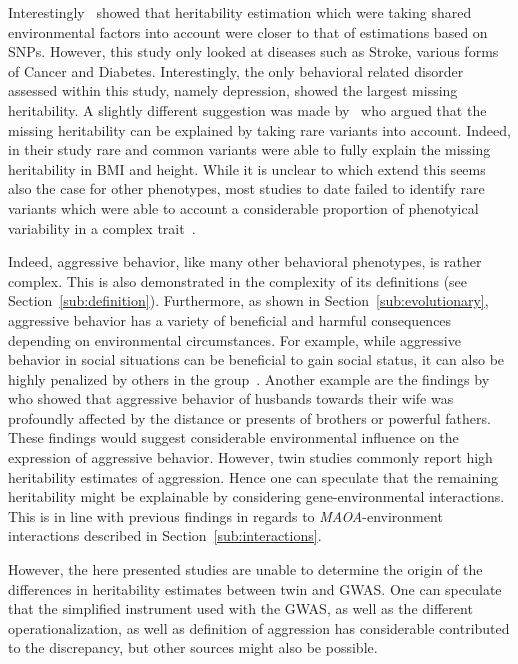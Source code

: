 Interestingly~\citet{Munoz2016a} showed that heritability estimation which were taking shared environmental factors into account were closer to that of estimations based on SNPs.
However, this study only looked at diseases such as Stroke, various forms of Cancer and Diabetes.
Interestingly, the only behavioral related disorder assessed within this study, namely depression, showed the largest missing heritability.
A slightly different suggestion was made by~\citet{Yang2015} who argued that the missing heritability can be explained by taking rare variants into account.
Indeed, in their study rare and common variants were able to fully explain the missing heritability in BMI and height.
While it is unclear to which extend this seems also the case for other phenotypes, most studies to date failed to identify rare variants which were able to account a considerable proportion of phenotyical variability in a complex trait~\cite{Chabris2015,Wray2011}.

Indeed, aggressive behavior, like many other behavioral phenotypes, is rather complex.
This is also demonstrated in the complexity of its definitions (see Section~\ref{sub:definition}).
Furthermore, as shown in Section~\ref{sub:evolutionary}, aggressive behavior has a variety of beneficial and harmful consequences depending on environmental circumstances. 
For example, while aggressive behavior in social situations can be beneficial to gain social status, it can also be highly penalized by others in the group~\cite{Buss1997}.
Another example are the findings by~\citet{Figueredo1995} who showed that aggressive behavior of husbands towards their wife was profoundly affected by the distance or presents of brothers or powerful fathers.
These findings would suggest considerable environmental influence on the expression of aggressive behavior.
However, twin studies commonly report high heritability estimates of aggression.
Hence one can speculate that the remaining heritability might be explainable by considering gene-environmental interactions.
This is in line with previous findings in regards to \textit{MAOA}-environment interactions described in Section~\ref{sub:interactions}.

However, the here presented studies are unable to determine the origin of the differences in heritability estimates between twin and GWAS\@.
One can speculate that the simplified instrument used with the GWAS, as well as the different operationalization, as well as definition of aggression has considerable contributed to the discrepancy, but other sources might also be possible.

